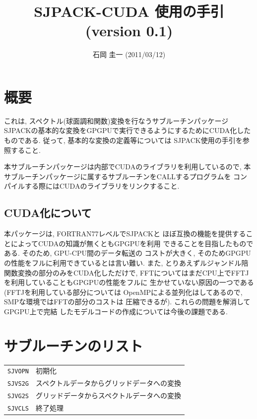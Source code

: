 \documentclass[a4j,fleqn]{jarticle}
\title{SJPACK-CUDA 使用の手引 (version 0.1)}
\author{石岡 圭一  (2011/03/12)}
\date{}
\begin{document}
\maketitle

\section{概要}

これは, スペクトル(球面調和関数)変換を行なうサブルーチンパッケージ
SJPACKの基本的な変換をGPGPUで実行できるようにするためにCUDA化した
ものである. 従って, 基本的な変換の定義等については
SJPACK使用の手引を参照すること.

本サブルーチンパッケージは内部でCUDAのライブラリを利用しているので,
本サブルーチンパッケージに属するサブルーチンをCALLするプログラムを
コンパイルする際にはCUDAのライブラリをリンクすること.

\subsection{CUDA化について}

本パッケージは, FORTRAN77レベルでSJPACKと
ほぼ互換の機能を提供することによってCUDAの知識が無くともGPGPUを利用
できることを目指したものである. そのため, GPU-CPU間のデータ転送の
コストが大きく, そのためGPGPUの性能をフルに利用できているとは言い難い.
また, とりあえずルジャンドル陪関数変換の部分のみをCUDA化しただけで,
FFTについてはまだCPU上でFFTJを利用していることもGPGPUの性能をフルに
生かせていない原因の一つである(FFTJを利用している部分については
OpenMPによる並列化はしてあるので, SMPな環境ではFFTの部分のコストは
圧縮できるが). これらの問題を解消してGPGPU上で完結
したモデルコードの作成については今後の課題である.


\section{サブルーチンのリスト}

\vspace{1em}
\begin{tabular}{ll}
{\tt SJVOPN} & 初期化\\
{\tt SJVS2G} & スペクトルデータからグリッドデータへの変換\\
{\tt SJVG2S} & グリッドデータからスペクトルデータへの変換\\
{\tt SJVCLS} & 終了処理
\end{tabular}
\end{document}
